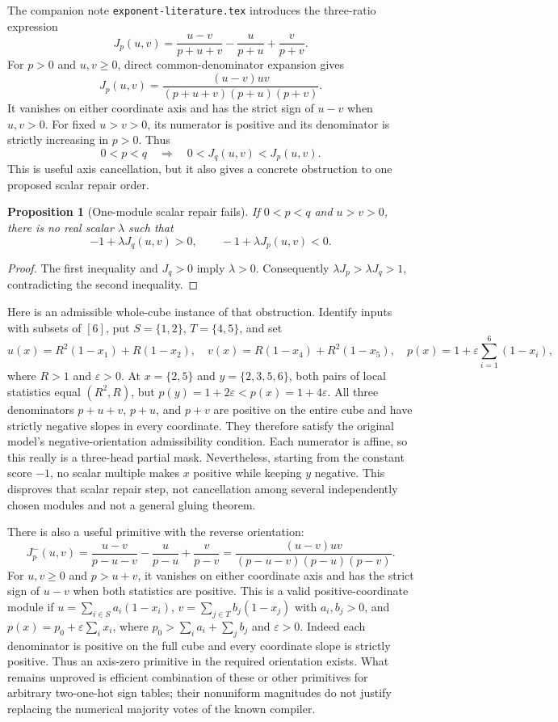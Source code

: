 \documentclass[11pt]{article}
\newtheorem{proposition}[theorem]{Proposition}
\begin{document}
The companion note \texttt{exponent-literature.tex} introduces the
three-ratio expression
\[
 J_p(u,v)=\frac{u-v}{p+u+v}-\frac{u}{p+u}+\frac{v}{p+v}.
\]
For $p>0$ and $u,v\geq0$, direct common-denominator expansion gives
\[
 J_p(u,v)=\frac{(u-v)uv}{(p+u+v)(p+u)(p+v)}.
\]
It vanishes on either coordinate axis and has the strict sign
of $u-v$ when $u,v>0$. For fixed $u>v>0$, its numerator is positive
and its denominator is strictly increasing in $p>0$. Thus
\[
 0<p<q\quad\Longrightarrow\quad 0<J_q(u,v)<J_p(u,v).
\]
This is useful axis cancellation, but it also gives a concrete
obstruction to one proposed scalar repair order.

\begin{proposition}[One-module scalar repair fails]
If $0<p<q$ and $u>v>0$, there is no real scalar $\lambda$ such that
\[
 -1+\lambda J_q(u,v)>0,
 \qquad -1+\lambda J_p(u,v)<0.
\]
\end{proposition}
\begin{proof}
The first inequality and $J_q>0$ imply $\lambda>0$.
Consequently $\lambda J_p>\lambda J_q>1$, contradicting the
second inequality.
\end{proof}

Here is an admissible whole-cube instance of that obstruction. Identify
inputs with subsets of $[6]$, put $S=\{1,2\}$, $T=\{4,5\}$, and set
\[
 u(x)=R^2(1-x_1)+R(1-x_2),\quad
 v(x)=R(1-x_4)+R^2(1-x_5),\quad
 p(x)=1+\varepsilon\sum_{i=1}^6(1-x_i),
\]
where $R>1$ and $\varepsilon>0$. At
$x=\{2,5\}$ and $y=\{2,3,5,6\}$, both pairs of local statistics
equal $(R^2,R)$, but $p(y)=1+2\varepsilon<p(x)=1+4\varepsilon$.
All three denominators $p+u+v$, $p+u$, and $p+v$ are positive
on the entire cube and have strictly negative slopes in every
coordinate. They therefore satisfy the original model's
negative-orientation admissibility condition. Each numerator is
affine, so this really is a three-head partial mask. Nevertheless,
starting from the constant score $-1$, no scalar multiple makes
$x$ positive while keeping $y$ negative. This disproves that scalar
repair step, not cancellation among several independently chosen
modules and not a general gluing theorem.

There is also a useful primitive with the reverse orientation:
\[
 J^-_p(u,v)=\frac{u-v}{p-u-v}-\frac{u}{p-u}+\frac{v}{p-v}
 =\frac{(u-v)uv}{(p-u-v)(p-u)(p-v)}.
\]
For $u,v\geq0$ and $p>u+v$, it vanishes on either coordinate
axis and has the strict sign of $u-v$ when both statistics are
positive. This is a valid positive-coordinate module if
$u=\sum_{i\in S}a_i(1-x_i)$,
$v=\sum_{j\in T}b_j(1-x_j)$ with $a_i,b_j>0$, and
$p(x)=p_0+\varepsilon\sum_i x_i$, where
$p_0>\sum_i a_i+\sum_j b_j$ and $\varepsilon>0$.
Indeed each denominator is positive on the full cube and every
coordinate slope is strictly positive. Thus an axis-zero primitive
in the required orientation exists. What remains unproved is
efficient combination of these or other primitives for arbitrary
two-one-hot sign tables; their nonuniform magnitudes do not justify
replacing the numerical majority votes of the known compiler.
\end{document}
